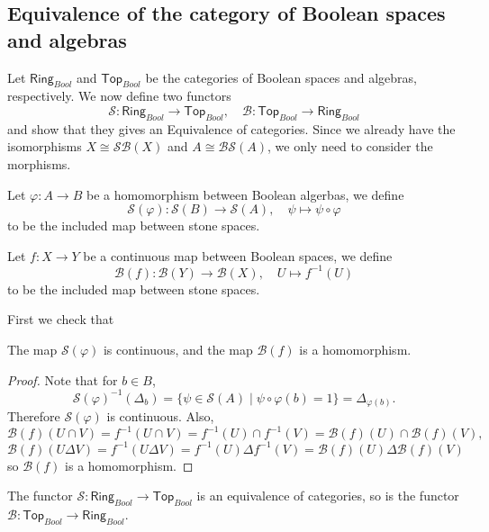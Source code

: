 \subsection{Equivalence of the category of Boolean spaces and algebras}
Let $\mathsf{Ring}_{Bool}$ and $\mathsf{Top}_{Bool}$ be the categories of Boolean spaces and algebras, respectively. We now define two functors
\[\mathcal{S}:\mathsf{Ring}_{Bool}\to\mathsf{Top}_{Bool},\quad \mathcal{B}:\mathsf{Top}_{Bool}\to\mathsf{Ring}_{Bool}\]
and show that they gives an Equivalence of categories. Since we already have the isomorphisms $X\cong\mathcal{S}\mathcal{B}(X)$ and $A\cong\mathcal{B}\mathcal{S}(A)$, we only need to consider the morphisms.
\begin{definition}
Let $\varphi:A\to B$ be a homomorphism between Boolean algerbas, we define 
\[\mathcal{S}(\varphi):\mathcal{S}(B)\to\mathcal{S}(A),\quad \psi\mapsto\psi\circ\varphi\]
to be the included map between stone spaces.
\end{definition}
\begin{definition}
Let $f:X\to Y$ be a continuous map between Boolean spaces, we define
\[\mathcal{B}(f):\mathcal{B}(Y)\to\mathcal{B}(X),\quad U\mapsto f^{-1}(U)\]
to be the included map between stone spaces.
\end{definition}
First we check that
\begin{lemma}
The map $\mathcal{S}(\varphi)$ is continuous, and the map $\mathcal{B}(f)$ is a homomorphism.
\end{lemma}
\begin{proof}
Note that for $b\in B$,
\[\mathcal{S}(\varphi)^{-1}(\Delta_b)=\{\psi\in\mathcal{S}(A)\mid\psi\circ\varphi(b)=1\}=\Delta_{\varphi(b)}.\]
Therefore $\mathcal{S}(\varphi)$ is continuous. Also,
\[\mathcal{B}(f)(U\cap V)=f^{-1}(U\cap V)=f^{-1}(U)\cap f^{-1}(V)=\mathcal{B}(f)(U)\cap\mathcal{B}(f)(V),\]
\[\mathcal{B}(f)(U\Delta V)=f^{-1}(U\Delta V)=f^{-1}(U)\Delta f^{-1}(V)=\mathcal{B}(f)(U)\Delta\mathcal{B}(f)(V)\]
so $\mathcal{B}(f)$ is a homomorphism.
\end{proof}
\begin{theorem}
The functor $\mathcal{S}:\mathsf{Ring}_{Bool}\to\mathsf{Top}_{Bool}$ is an equivalence of categories, so is the functor $\mathcal{B}:\mathsf{Top}_{Bool}\to\mathsf{Ring}_{Bool}$.
\end{theorem}
